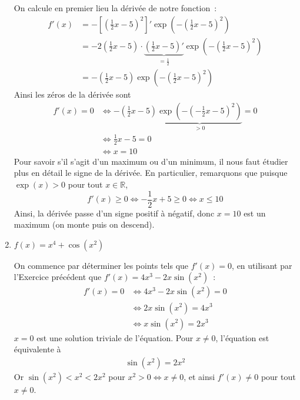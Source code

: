 \begin{exercice}[Extremum]
\begin{enumerate}
    On calcule en premier lieu la dérivée de notre fonction~:
    \begin{align*}
    f'(x) & = -\left[\left(\frac{1}{2} x - 5 \right)^2\right]' \exp{\left(- \left(\frac{1}{2}x - 5 \right)^2 \right)} \\
          & = - 2 \left(\frac{1}{2}x - 5 \right) \cdot \underbrace{\left(\frac{1}{2}x - 5 \right)'}_{=\frac{1}{2}} \exp{\left(- \left(\frac{1}{2}x - 5 \right)^2 \right)} \\
          & = - \left(\frac{1}{2}x - 5 \right) \exp{\left(- \left(\frac{1}{2}x - 5 \right)^2 \right)}
    \end{align*}
    Ainsi les zéros de la dérivée sont
    \begin{align*}
    f'(x) = 0 & \iff  - \left(\frac{1}{2} x - 5 \right) \underbrace{\exp{\left( - \left( -\frac{1}{2}x - 5 \right)^2 \right)}}_{> 0} = 0 \\
        &\iff \frac{1}{2} x - 5 = 0 \\
        &\iff x = 10
    \end{align*}
    Pour savoir s'il s'agit d'un maximum ou d'un minimum, il nous faut étudier plus en détail le signe de la dérivée. En particulier, remarquons que puisque $\exp(x) > 0$ pour tout $x \in \mathbb{R}$,
    \[
    f'(x) \geq 0 \iff -\frac{1}{2}x + 5 \geq 0 \iff x \leq 10
    \]
    Ainsi, la dérivée passe d'un signe positif à négatif, donc $x = 10$ est un maximum (on monte puis on descend).
    
    \item $f(x) = x^4 + \cos(x^2)$
    
    On commence par déterminer les points tels que $f'(x) = 0$, en utilisant par l'Exercice précédent que $f'(x) = 4 x^3 - 2 x \sin(x^2)$~:
    \begin{align*}
    f'(x) = 0 & \iff 4 x^3 - 2 x \sin(x^2) = 0 \\
              & \iff 2x \sin(x^2) = 4 x^3 \\
              & \iff x \sin(x^2) = 2 x^3
    \end{align*}
    $x = 0$ est une solution triviale de l'équation. Pour $x \neq 0$, l'équation est équivalente à
    \begin{align*}
    \sin(x^2) = 2x^2
    \end{align*}
    Or $\sin(x^2) < x^2 < 2x^2$ pour $x^2 > 0 \iff x \neq 0$, et ainsi $f'(x) \neq 0$ pour tout $x \neq 0$. 
    
    

\end{enumerate}
\end{exercice}
